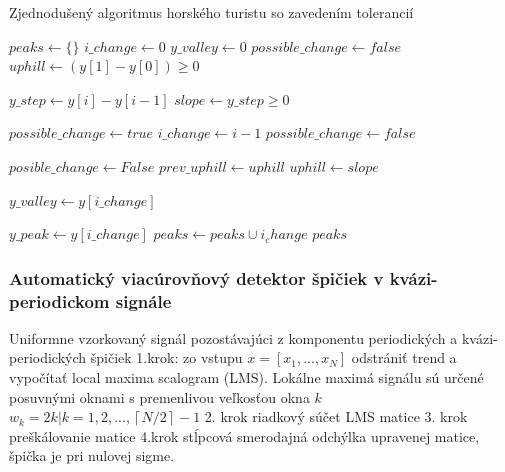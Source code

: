 \begin{algorithm}
\caption{Zjednodušený algoritmus horského turistu so zavedením tolerancií}
\begin{algorithmic}[1]
	\State $peaks \gets \{\}$
	\State $i\_change \gets 0$
	\State $y\_valley \gets 0$
	\State $possible\_change \gets false$
	\State $uphill \gets (y[1] - y[0]) \geq 0$
	
		\State $y\_step \gets y[i] - y[i-1]$
        \State $slope \gets y\_step \geq 0$

        	\State $possible\_change \gets true$   
        	\State $i\_change \gets i - 1$
        	\State $possible\_change \gets false$  
        \EndIf
        

        	\State $posible\_change \gets False$
        	\State $prev\_uphill \gets uphill$
        	\State $uphill \gets slope$
        	
				\State $y\_valley \gets y[i\_change]$   
                
				\State $y\_peak \gets y[i\_change]$    
				\State $peaks \gets peaks \cup i_change$              
            \EndIf      	
        \EndIf       
	\EndFor
	\State \Return $peaks$
\EndFunction
\end{algorithmic}
\end{algorithm}

\subsubsection{Automatický viacúrovňový detektor špičiek v kvázi-periodickom signále}
\cite{ampd-algorithm}
Uniformne vzorkovaný signál pozostávajúci z komponentu periodických a kvázi-periodických špičiek
1.krok: zo vstupu $x = [x_1, ..., x_N]$ odstrániť trend a vypočítať local maxima scalogram (LMS). Lokálne maximá signálu sú určené 
posuvnými oknami s premenlivou veľkosťou okna $k$ ${w_k = 2k | k = 1, 2, ..., \left\lceil N/2 \right\rceil - 1}$
2. krok riadkový súčet LMS matice
3. krok preškálovanie matice
4.krok stĺpcová smerodajná odchýlka upravenej matice, špička je pri nulovej sigme.

